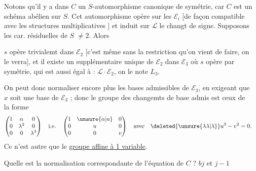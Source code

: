 Notons qu'il y a dans $C$ un $S$-automorphisme canonique de symétrie, car $C$ est un schéma abélien sur $S$. Cet automorphisme  opère sur les $\mathcal E_i$ [de façon compatible avec les structures multiplicatives ] et induit sur $\mathcal L$ le changt de signe.   Supposons les car. résiduelles de $S$ $\ne2$. Alors



$s$ opère trivialemt dans $\mathcal E_2$ [c'est même sans la restriction qu'on vient de faire, on le verra], et il existe un supplémentaire unique  de $\mathcal E_2$ dans $\mathcal E_3$ où $s$ opère par symétrie,  qui est aussi égal à : $\mathcal L\cdot\mathcal E_2$, on le note $L_3$.

 On peut donc normaliser encore plus les bases admissibles de $\mathcal E_3$, en exigeant que $x$ soit une base de $\mathcal E_3$ ; donc le groupe des changemts de base admis est ceux de la forme
\[
\begin{pmatrix}1&\alpha&0\\0&\lambda^2&0\\0&0&\lambda^3\end{pmatrix}
\quad\text{i.e.}\quad
\begin{pmatrix}1&\unsure{\alpha|a}&0\\0&u&0\\0&0&v\end{pmatrix}
\quad\text{avec}\quad\deleted{\unsure{\lambda\lambda|\lambda}}u^3-v^2=0.
\]
Ce n'est autre que le \uline{groupe affine à 1 variable}.

Quelle est la normalisation correspondante de l'équation de $C$ ?
 $b$\qquad $j$ et $j-1$ 

